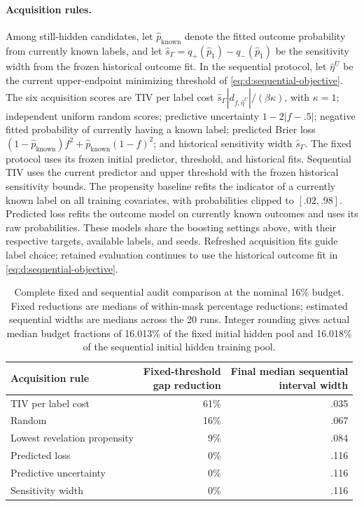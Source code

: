 \paragraph{Acquisition rules.}
Among still-hidden candidates, let $\widehat p_{\mathrm{known}}$ denote the fitted outcome
probability from currently known labels, and let $\widehat s_\Gamma=q_+(\widehat
p_1)-q_-(\widehat p_1)$ be the sensitivity width from the frozen historical outcome fit. In
the sequential protocol, let $\widehat\eta^U$ be the current upper-endpoint minimizing
threshold of \eqref{eq:d:sequential-objective}. The six acquisition scores are TIV per label
cost $\widehat s_\Gamma|d_{f,\widehat\eta^U}|/(\beta\kappa)$, with $\kappa=1$; independent
uniform random scores; predictive uncertainty $1-2|f-.5|$; negative fitted probability of
currently having a known label; predicted Brier loss $(1-\widehat
p_{\mathrm{known}})f^2+\widehat p_{\mathrm{known}}(1-f)^2$; and historical sensitivity width
$\widehat s_\Gamma$. The fixed protocol uses its frozen initial predictor, threshold, and
historical fits. Sequential TIV uses the current predictor and upper threshold with the
frozen historical sensitivity bounds. The propensity baseline refits the indicator of a
currently known label on all training covariates, with probabilities clipped to $[.02,.98]$.
Predicted loss refits the outcome model on currently known outcomes and uses its raw
probabilities. These models share the boosting settings above, with their respective
targets, available labels, and seeds. Refreshed acquisition fits guide label choice;
retained evaluation continues to use the historical outcome fit in
\eqref{eq:d:sequential-objective}.

\begin{table}[!htbp]
\centering\small
\begin{tabular}{@{}lrr@{}}
\toprule
Acquisition rule & \shortstack[r]{Fixed-threshold\\gap reduction}
& \shortstack[r]{Final median sequential\\interval width}\\
\midrule
TIV per label cost & 61\% & .035\\
Random & 16\% & .067\\
Lowest revelation propensity & 9\% & .084\\
Predicted loss & 0\% & .116\\
Predictive uncertainty & 0\% & .116\\
Sensitivity width & 0\% & .116\\
\bottomrule
\end{tabular}
\caption{Complete fixed and sequential audit comparison at the nominal 16\%
budget. Fixed reductions are medians of within-mask percentage reductions;
estimated sequential widths are medians across the 20 runs. Integer rounding gives actual median budget fractions of 16.013\% of the fixed initial hidden pool and 16.018\% of the sequential initial hidden training pool.}
\label{tab:audit-protocols}
\end{table}

